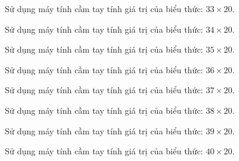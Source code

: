 \begin{ex}
  Sử dụng máy tính cầm tay tính giá trị của biểu thức: $33 \times 20$.
\end{ex}

\begin{ex}
  Sử dụng máy tính cầm tay tính giá trị của biểu thức: $34 \times 20$.
\end{ex}

\begin{ex}
  Sử dụng máy tính cầm tay tính giá trị của biểu thức: $35 \times 20$.
\end{ex}

\begin{ex}
  Sử dụng máy tính cầm tay tính giá trị của biểu thức: $36 \times 20$.
\end{ex}

\begin{ex}
  Sử dụng máy tính cầm tay tính giá trị của biểu thức: $37 \times 20$.
\end{ex}

\begin{ex}
  Sử dụng máy tính cầm tay tính giá trị của biểu thức: $38 \times 20$.
\end{ex}

\begin{ex}
  Sử dụng máy tính cầm tay tính giá trị của biểu thức: $39 \times 20$.
\end{ex}

\begin{ex}
  Sử dụng máy tính cầm tay tính giá trị của biểu thức: $40 \times 20$.
\end{ex}
